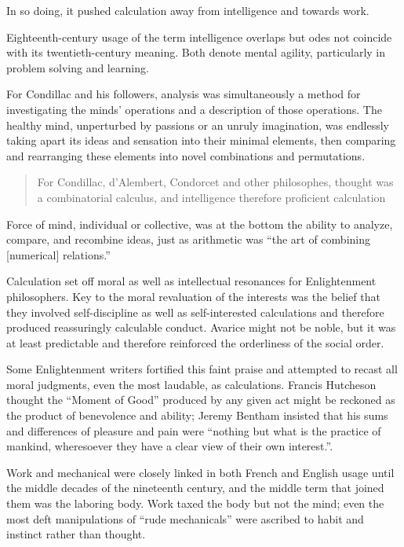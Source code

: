 \documentclass[version=last,draft=true,paper=A4,portrait,twoside=true,twocolumn=false,headinclude=false,footinclude=false,fontsize=12,BCOR=20mm,DIV=calc,pagesize=auto,titlepage=firstiscover,mpinclude=true,open=right,chapterprefix=true,numbers=autoendperiod,headsepline=false,headings=twolinechapter,parskip=false]{scrbook}
\begin{document}
In so doing, it pushed calculation away from intelligence and towards work. 

Eighteenth-century usage of the term intelligence overlaps but odes not
coincide with its twentieth-century meaning. Both denote mental agility,
particularly in problem solving and learning. 

For Condillac and his followers, analysis was simultaneously a method for
investigating the minds' operations and a description of those operations.
The healthy mind, unperturbed by passions or an unruly imagination, was
endlessly taking apart its ideas and sensation into their minimal elements,
then comparing and rearranging these elements into novel combinations and
permutations. 

\begin{quote}
For Condillac, d'Alembert, Condorcet and other philosophes, thought was
a combinatorial calculus, and intelligence therefore proficient calculation
\end{quote}

Force of mind, individual or collective, was at the bottom the ability to
analyze, compare, and recombine ideas, just as arithmetic was ``the art of
combining [numerical] relations.'' 

Calculation set off moral as well as intellectual resonances for
Enlightenment philosophers. Key to the moral revaluation of the interests
was the belief that they involved self-discipline as well as
self-interested calculations and therefore produced reassuringly calculable
conduct. Avarice might not be noble, but it was at least predictable and
therefore reinforced the orderliness of the social order.

\begin{displayquote}
Some Enlightenment writers fortified this faint praise and attempted to
recast all moral judgments, even the most laudable, as calculations.
Francis Hutcheson thought the ``Moment of Good'' produced by any given act
might be reckoned as the product of benevolence and ability; Jeremy Bentham
insisted that his sums and differences of pleasure and pain were ``nothing
but what is the practice of mankind, wheresoever they have a clear view of
their own interest.''. 
\end{displayquote}

Work and mechanical were closely linked in both French and English usage
until the middle decades of the nineteenth century, and the middle term
that joined them was the laboring body. Work taxed the body but not the
mind; even the most deft manipulations of ``rude mechanicals'' were
ascribed to habit and instinct rather than thought.
\end{document}
